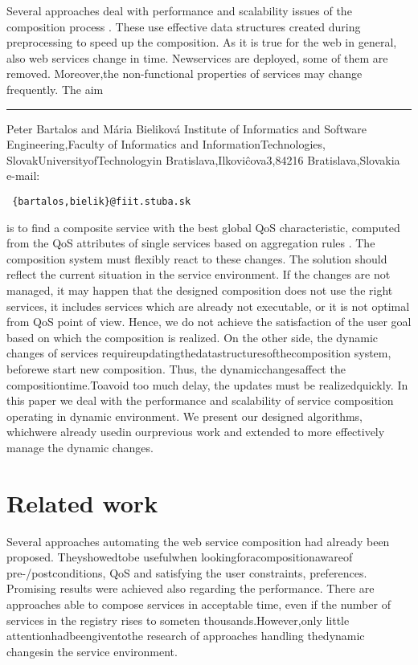 \documentclass{llncs}
\begin{document}
	Several approaches deal with performance and scalability issues of the composition 
process \cite{3, 5, 6, 9, 12}. These use effective data structures created during 
preprocessing to speed up the composition. As it is true for the web in general, also 
web services change in time. Newservices are deployed, some of them are removed. 
Moreover,the non-functional properties of services may change frequently. The aim 

\rule{\textwidth}{2pt}
\small Peter Bartalos and M\'{a}ria Bielikov\'{a} 
Institute of Informatics and Software Engineering,Faculty of Informatics and InformationTechnologies,
SlovakUniversityofTechnologyin Bratislava,Ilkovi\^{c}ova3,84216 Bratislava,Slovakia 
e-mail:
\begin{verbatim}
 {bartalos,bielik}@fiit.stuba.sk 
\end{verbatim}

\clearpage



\rm
is to find a composite service with the best global QoS characteristic, computed 
from the QoS attributes of single services based on aggregation rules \cite{3, 13, 15}. 
The composition system must flexibly react to these changes. The solution should 
reflect the current situation in the service environment. If the changes are not managed, 
it may happen that the designed composition does not use the right services, 
it includes services which are already not executable, or it is not optimal from QoS 
point of view. Hence, we do not achieve the satisfaction of the user goal based on 
which the composition is realized. On the other side, the dynamic changes of services 
requireupdatingthedatastructuresofthecomposition system, beforewe start 
new composition. Thus, the dynamicchangesaffect the compositiontime.Toavoid 
too much delay, the updates must be realizedquickly. In this paper we deal with the 
performance and scalability of service composition operating in dynamic environment.
We present our designed algorithms, whichwere already usedin ourprevious 
work and extended to more effectively manage the dynamic changes. 

 \section{Related work }


Several approaches automating the web service composition had already been proposed.
Theyshowedtobe usefulwhen lookingforacompositionawareof pre-/po\-stconditions, 
QoS and satisfying the user constraints, preferences. Promising results 
were achieved also regarding the performance. There are approaches able to compose 
services in acceptable time, even if the number of services in the registry rises 
to someten thousands.However,only little attentionhadbeengiventothe research 
of approaches handling thedynamic changesin the service environment. 
\end{document}
